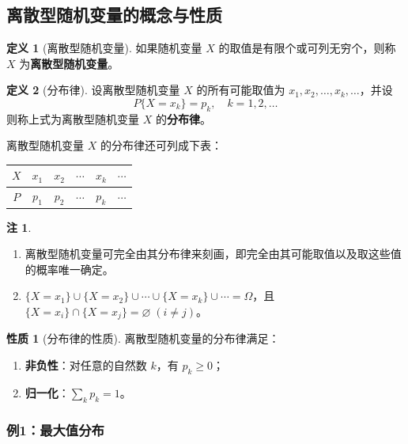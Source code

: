 \documentclass[11pt,a4paper]{report}
\theoremstyle{definition}
\newtheorem{definition}{定义}[chapter]
\newtheorem{note}{注}[chapter]
\newtheorem{property}{性质}[chapter]
\begin{document}
\subsection{离散型随机变量的概念与性质}

\begin{definition}[离散型随机变量]
如果随机变量 $X$ 的取值是有限个或可列无穷个，则称 $X$ 为\textbf{离散型随机变量}。
\end{definition}

\begin{definition}[分布律]
设离散型随机变量 $X$ 的所有可能取值为 $x_1, x_2, \dots, x_k, \dots$，并设
\[
P\{X = x_k\} = p_k, \quad k=1,2,\dots
\]
则称上式为离散型随机变量 $X$ 的\textbf{分布律}。

离散型随机变量 $X$ 的分布律还可列成下表：
\begin{table}[htbp]
\centering
\begin{tabular}{@{}cccccc@{}}
\toprule
$X$ & $x_1$ & $x_2$ & $\cdots$ & $x_k$ & $\cdots$ \\
\midrule
$P$ & $p_1$ & $p_2$ & $\cdots$ & $p_k$ & $\cdots$ \\
\bottomrule
\end{tabular}
\end{table}
\end{definition}

\begin{note}
\begin{enumerate}[leftmargin=2em]
    \item 离散型随机变量可完全由其分布律来刻画，即完全由其可能取值以及取这些值的概率唯一确定。
    \item $\{X=x_1\} \cup \{X=x_2\} \cup \cdots \cup \{X=x_k\} \cup \cdots = \Omega$，且 $\{X=x_i\} \cap \{X=x_j\} = \varnothing\;(i \neq j)$。
\end{enumerate}
\end{note}

\begin{property}[分布律的性质]
离散型随机变量的分布律满足：
\begin{enumerate}[label=(\arabic*),leftmargin=2em]
    \item \textbf{非负性}：对任意的自然数 $k$，有 $p_k \geq 0$；
    \item \textbf{归一化}：$\displaystyle\sum_{k} p_k = 1$。
\end{enumerate}
\end{property}

\subsubsection{例1：最大值分布}
\end{document}
